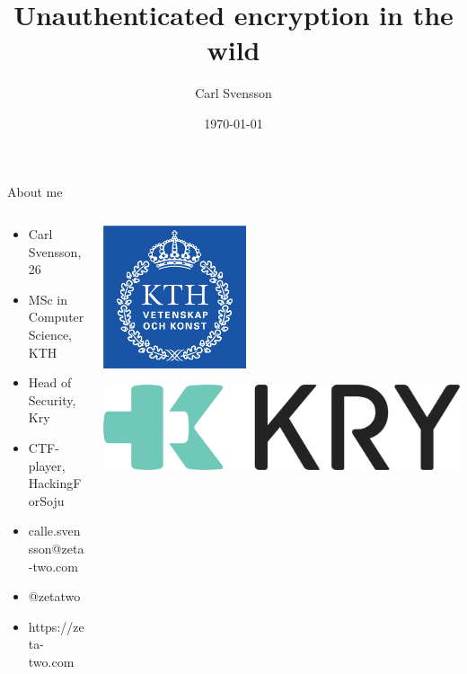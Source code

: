 \documentclass[10pt, compress]{beamer}
\title{Unauthenticated encryption in the wild}
\date{\today}
\author{Carl Svensson}
\institute{SEC-T 2017}
\begin{document}
\maketitle

\begin{frame}{About me}
  
	\begin{columns}
		\begin{column}{0.6\textwidth}  
  
  		\begin{itemize}
		  \item Carl Svensson, 26
		  \item MSc in Computer Science, KTH
		  \item Head of Security, Kry
		  \item CTF-player, HackingForSoju
		  \item \faEnvelope \hskip 2mm calle.svensson@zeta-two.com
		  \item \faTwitter \hskip 2mm  @zetatwo
		  \item \faGlobe \hskip 2mm https://zeta-two.com
		\end{itemize}
		
		\end{column}
		\begin{column}{0.4\textwidth} 
			\begin{center}
			\includegraphics[width=0.4\textwidth]{images/kth.jpg}
			\end{center}
			\vspace{1cm}
			\includegraphics[width=\textwidth]{images/kry_logo.png}
		\end{column}
	\end{columns}
  
\end{frame}
\end{document}
